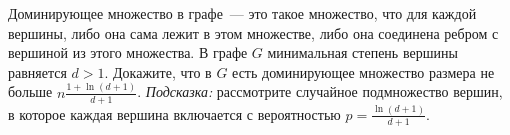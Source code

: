 Доминирующее множество в графе~--- это такое множество, что для каждой вершины, либо она сама лежит в
этом множестве, либо она соединена ребром с вершиной из этого множества. В графе $G$ минимальная степень
вершины равняется $d > 1$. Докажите, что в $G$ есть доминирующее множество размера не больше
$n \frac{1 + \ln(d + 1)}{d + 1}$. \textit{Подсказка:} рассмотрите случайное подмножество вершин, в
которое каждая вершина включается с вероятностью $p = \frac{\ln(d + 1)}{d + 1}$.
